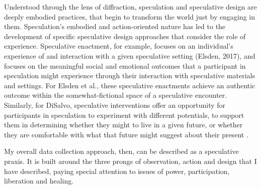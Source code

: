 Understood through the lens of diffraction, speculation and speculative design are deeply embodied practices, that begin to transform the world just by engaging in them. Speculation's embodied and action-oriented nature has led to the development of specific speculative design approaches that consider the role of experience. Speculative enactment, for example, focuses on an individual's experience of and interaction with a given speculative setting (Elsden, 2017), and focuses on the meaningful social and emotional outcomes that a participant in speculation might experience through their interaction with speculative materials and settings. For Elsden et al., these speculative enactments achieve an authentic outcome within the somewhat-fictional space of a speculative encounter. Similarly, for DiSalvo, speculative interventions offer an opportunity for participants in speculation to experiment with different potentials, to support them in determining whether they might to live in a given future, or whether they are comfortable with what that future might suggest about their present \cite{disalvo_irony_2016: 140}.

My overall data collection approach, then, can be described as a speculative praxis. It is built around the three prongs of observation, action and design that I have described, paying special attention to issues of power, participation, liberation and healing.  









  

